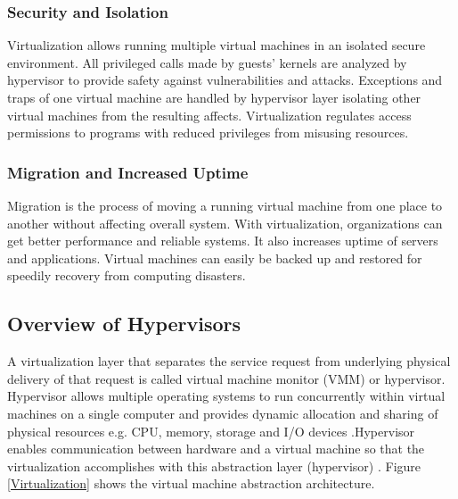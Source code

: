 \subsubsection{Security and Isolation\label{sec:security}}
Virtualization allows running multiple virtual machines in an isolated secure environment. All privileged calls made by guests' kernels are analyzed by hypervisor to provide safety against vulnerabilities and attacks. Exceptions and traps of one virtual machine are handled by hypervisor layer isolating other virtual machines from the resulting affects. Virtualization regulates access permissions to programs with reduced privileges from misusing resources. 

\subsubsection{Migration and Increased Uptime\label{sec:migration}}
Migration is the process of moving a running virtual machine from one place to another without affecting overall system. With virtualization, organizations can get better performance and reliable systems. It also increases uptime of servers and applications. Virtual machines can easily be backed up and restored for speedily recovery from computing disasters.


\subsection{Overview of Hypervisors\label{sec:aaa}}

A virtualization layer that separates the service request from underlying physical delivery of that request is called virtual machine monitor (VMM) or hypervisor. Hypervisor allows multiple operating systems to run concurrently within virtual machines on a single computer and provides dynamic allocation and sharing of physical resources e.g. CPU, memory, storage and I/O devices \cite{hypervisor1}.Hypervisor enables communication between hardware
and a virtual machine so that the virtualization accomplishes with this abstraction layer (hypervisor) \cite{hypervisor2}.  Figure \ref{Virtualization} shows the virtual machine abstraction architecture.


